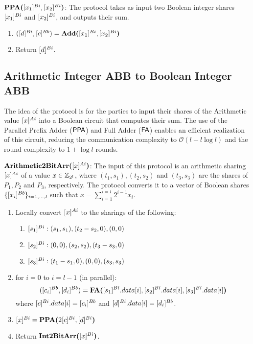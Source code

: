 \begin{protocol}
	$\textbf{PPA(}[x_1]^{Bi},[x_2]^{Bi}\textbf{)}$:
    The protocol takes as input two Boolean integer shares $[x_1]^{Bi}$ and $[x_2]^{Bi}$, and outputs their sum.
    \begin{enumerate}
        \item $([d]^{Bi}, [c]^{Bb}) = \textbf{Add(}[x_1]^{Bi}, [x_2]^{Bi}\textbf{)}$
        \item Return $[d]^{Bi}$.
    \end{enumerate}
\end{protocol}

\subsection{Arithmetic Integer ABB to Boolean Integer ABB}

The idea of the protocol is for the parties to input their shares of the Arithmetic value $[x]^{Ai}$ into a Boolean circuit that computes their sum.
The use of the Parallel Prefix Adder ($\mathsf{PPA}$) and Full Adder ($\mathsf{FA}$) enables an efficient realization of this circuit, reducing the communication complexity to $\mathcal{O}(l + l\log l)$ and the round complexity to $1 + \log l$ rounds.

\begin{protocol}
	$\textbf{Arithmetic2BitArr(}[x]^{Ai}\textbf{)}$:
    The input of this protocol is an arithmetic sharing $[x]^{Ai}$ of a value $x \in \mathbb{Z}_{2^l}$, where $(t_1, s_1), (t_2, s_2)$ and $(t_3, s_3)$ are the shares of $P_1, P_2$ and $P_3$, respectively.
    The protocol converts it to a vector of Boolean shares $\{[x_i]^{Bb}\}_{i = 1, \ldots, l}$ such that $x = \sum_{i = 1}^{i = l}2^{i - 1}x_i$.
	\begin{enumerate}
		\item Locally convert $[x]^{Ai}$ to the sharings of the following:
		\begin{enumerate}
            \item $[s_1]^{Bi}: (s_1, s_1), (t_2 - s_2, 0), (0, 0)$
            \item $[s_2]^{Bi}: (0, 0), (s_2, s_2), (t_3 - s_3, 0)$
            \item $[s_3]^{Bi}: (t_1 - s_1, 0), (0, 0), (s_3, s_3)$
        \end{enumerate}
        \item for $i = 0$ to $i = l - 1$ (in parallel):
            $$([c_i]^{Bb}, [d_i]^{Bb}) = \textbf{FA(}[s_1]^{Bi}.data[i],[s_2]^{Bi}.data[i],[s_3]^{Bi}.data[i]\textbf{)}$$
        where $[c]^{Bi}.data[i] = [c_i]^{Bb}$ and $[d]^{Bi}.data[i] = [d_i]^{Bb}$.
        \item $[x]^{Bi} = \textbf{PPA(}2[c]^{Bi},[d]^{Bi}\textbf{)}$
        \item Return $\textbf{Int2BitArr(}[x]^{Bi}\textbf{)}$.
	\end{enumerate}
\end{protocol}

